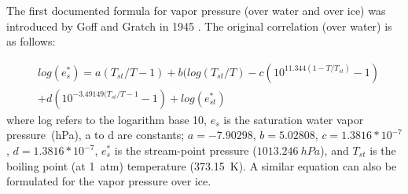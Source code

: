 The first documented formula for vapor pressure (over water and over ice) was introduced by Goff and Gratch in 1945 \cite{goff_gratch}. The original correlation (over water) is as follows:

\begin{equation}
\label{gratch}
\begin{split}
    &log({e}^{*}_{s}) = a(T_{st}/T - 1) + b(log(T_{st}/T) - c(10^{11.344(1-T/T_{st})} - 1) \\
    &+ d(10^{-3.49149(T_{st}/T - 1} -1) + log(e^{*}_{st})
\end{split}
\end{equation}
where log refers to the logarithm base 10, $e_{s}$ is the saturation water vapor pressure~(hPa), a to d are constants; $a = - 7.90298$, $b=5.02808$, $c=1.3816*10^{-7}$, $d=1.3816*10^{-7}$, $e^{*}_{s}$ is the stream-point pressure ($1013.246~hPa$), and $T_{st}$ is the boiling point (at 1~atm) temperature (373.15~K). A similar equation can also be formulated for the vapor pressure over ice. 

